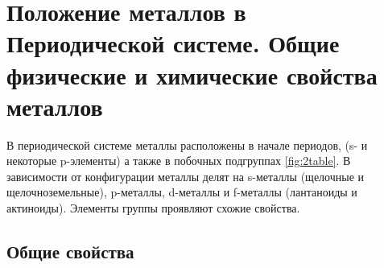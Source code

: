 \section{Положение металлов в Периодической системе. Общие физические и химические свойства металлов}

В периодической системе металлы расположены в начале периодов, (s- и некоторые p-элементы) а также в побочных подгруппах \ref{fig:2table}. В зависимости от конфигурации металлы делят на s-металлы (щелочные и щелочноземельные),  p-металлы, d-металлы и f-металлы (лантаноиды и актиноиды). Элементы группы проявляют схожие свойства.

\subsection{Общие свойства}

